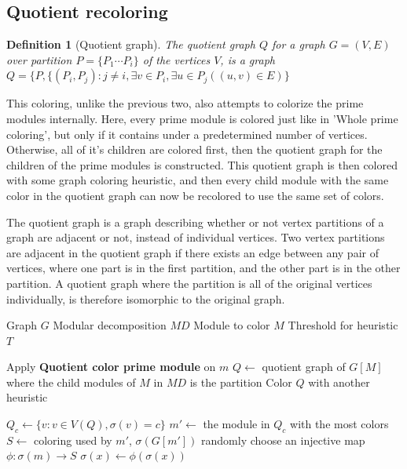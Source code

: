 \documentclass[a4paper]{article}
\newtheorem{definition}{Definition}[section]
\begin{document}
\subsection{Quotient recoloring}

\begin{definition}[Quotient graph]
    The quotient graph $Q$ for a graph $G = (V,E)$ over partition 
    $P = \{P_1 \cdots P_i\}$  of the vertices $V$, is a graph 
    $Q = \{P, \{(P_i,P_j) : j\neq i, \exists v \in P_i,\exists u \in P_j( (u,v)
    \in E)   \}   $
\end{definition}

This coloring, unlike the previous two, also attempts to colorize the prime
modules internally. Here, every prime module is colored just like in 'Whole
prime coloring', but only if it contains under a predetermined number of
vertices. Otherwise, all of it's children are colored first, then the quotient
graph for the children of the prime modules is constructed. This quotient graph
is then colored with some graph coloring heuristic, and then every child module
with the same color in the quotient graph can now be recolored to use the same
set of colors.

The quotient graph is a graph describing whether or not vertex partitions of a
graph are adjacent or not, instead of individual vertices. Two vertex
partitions are adjacent in the quotient graph if there exists an edge between
any pair of vertices, where one part is in the first partition, and the other
part is in the other partition. A quotient graph where the partition is all of
the original vertices individually, is therefore isomorphic to the original
graph.


\begin{algorithm}[H]
  \caption{Quotient color prime module}
  \begin{algorithmic}[1]
    \REQUIRE Graph $G$
    \REQUIRE Modular decomposition $MD$
    \REQUIRE Module to color $M$
    \REQUIRE Threshold for heuristic $T$

    \ENDIF
        \STATE Apply \textbf{Quotient color prime module} on $m$
    \ENDFOR
    \STATE $Q \leftarrow $ quotient graph of $G[M]$ where the child modules of $M$ in $MD$ is the partition
    \STATE Color $Q$ with another heuristic

        \STATE $Q_c \leftarrow \{ v : v \in V(Q), \sigma(v) = c\}$
        \STATE $m' \leftarrow$ the module in $Q_c$ with the most colors
        \STATE $S \leftarrow$ coloring used by $m'$, $\sigma(G[m'])$
            \STATE randomly choose an injective map $\phi:\sigma(m)\to S$
                \STATE $\sigma(x) \leftarrow \phi(\sigma(x))$
            \ENDFOR
        \ENDFOR
    \ENDFOR

  \end{algorithmic}
\end{algorithm}
\end{document}
